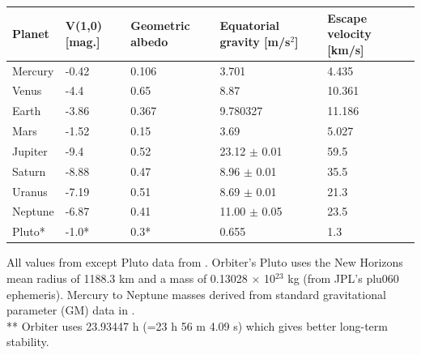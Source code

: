 \documentclass[Orbiter User Manual.tex]{subfiles}
\begin{document}
	\begin{longtable}{ |p{}|p{}|p{}|p{}|p{}| }
	\hline\rule{0pt}{2ex}
	\textbf{Planet} & \textbf{V(1,0) [mag.]} & \textbf{Geometric albedo} & \textbf{Equatorial gravity [m/s$^{2}$]} & \textbf{Escape velocity [km/s]}\\
	\hline\rule{0pt}{2ex}
	Mercury & -0.42 & 0.106 & 3.701 & 4.435\\
	\hline\rule{0pt}{2ex}
	Venus & -4.4 & 0.65 & 8.87 & 10.361\\
	\hline\rule{0pt}{2ex}
	Earth & -3.86 & 0.367 & 9.780327 & 11.186\\
	\hline\rule{0pt}{2ex}
	Mars & -1.52 & 0.15 & 3.69 & 5.027\\
	\hline\rule{0pt}{2ex}
	Jupiter & -9.4 & 0.52 & 23.12 $\pm$ 0.01 & 59.5\\
	\hline\rule{0pt}{2ex}
	Saturn & -8.88 & 0.47 & 8.96 $\pm$ 0.01 & 35.5\\
	\hline\rule{0pt}{2ex}
	Uranus & -7.19 & 0.51 & 8.69 $\pm$ 0.01 & 21.3\\
	\hline\rule{0pt}{2ex}
	Neptune & -6.87 & 0.41 & 11.00 $\pm$ 0.05 & 23.5\\ 
	\hline\rule{0pt}{2ex}
	Pluto* & -1.0* & 0.3* & 0.655 & 1.3\\
	\hline
	\end{longtable}

\noindent
All values from \cite{yoder1995} except Pluto data from \cite{seidelmann1992p706}. Orbiter's Pluto uses the New Horizons mean radius of 1188.3 km and a mass of 0.13028 $\times$ 10$^{23}$ kg (from JPL's plu060 ephemeris). Mercury to Neptune masses derived from standard gravitational parameter (GM) data in \cite{yoder1995}.\\
** Orbiter uses 23.93447 h (=23 h 56 m 4.09 s) which gives better long-term stability.
\end{document}
